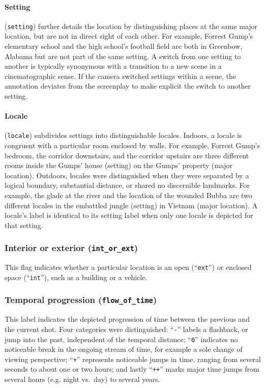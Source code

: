 \documentclass[10pt,a4paper]{article}
\begin{document}
\begin{multicols}{2}
\paragraph{Setting} (\texttt{setting}) further details the location by
distinguishing places at the same major location, but are not in direct sight of
each other. For example, Forrest Gump's elementary school and the high school's
football field are both in Greenbow, Alabama but are not part of the same
setting. A switch from one setting to another is typically synonymous with a
transition to a new scene in a cinematographic sense. If the camera switched
settings within a scene, the annotation deviates from the screenplay to make
explicit the switch to another setting.

\paragraph{Locale} (\texttt{locale}) subdivides settings into distinguishable
locales. Indoors, a locale is congruent with a particular room enclosed by
walls. For example, Forrest Gump's bedroom, the corridor downstairs, and the
corridor upstairs are three different rooms inside the Gumps' house (setting)
on the Gumps' property (major location). Outdoors, locales were distinguished
when they were separated by a logical boundary, substantial distance, or shared
no discernible landmarks. For example, the glade at the river and the location
of the wounded Bubba are two different locales in the embattled jungle (setting)
in Vietnam (major location). A locale's label is identical to its setting label
when only one locale is depicted for that setting.


\subsubsection*{Interior or exterior (\texttt{int\_or\_ext})}

This flag indicates whether a particular location is an open
(``\texttt{ext}'') or enclosed space (``\texttt{int}''), such as a building
or a vehicle.


\subsubsection*{Temporal progression (\texttt{flow\_of\_time})}

This label indicates the depicted progression of time between the previous and
the current shot. Four categories were distinguished: ``\texttt{-}'' labels a
flashback, or jump into the past, independent of the temporal distance;
``\texttt{0}'' indicates no noticeable break in the ongoing stream of time, for
example a sole change of viewing perspective; ``\texttt{+}'' represents
noticeable jumps in time, ranging from several seconds to about one or two
hours; and lastly ``\texttt{++}'' marks major time jumps from several hours
(e.g. night vs.~day) to several years.



\end{multicols}
\end{document}
